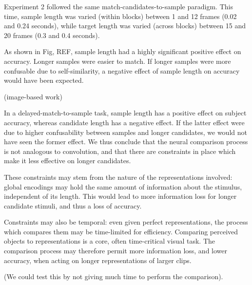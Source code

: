 \documentclass{jov}
\begin{document}
Experiment 2 followed the same match-candidates-to-sample paradigm. This time, sample length was varied (within blocks) between 1 and 12 frames (0.02 and 0.24 seconds), while target length was varied (across blocks) between 15 and 20 frames (0.3 and 0.4 seconds).

As shown in Fig, REF, sample length had a highly significant positive effect on accuracy. Longer samples were easier to match. If longer samples were more confusable due to self-similarity, a negative effect of sample length on accuracy would have been expected.

(image-based work)


In a delayed-match-to-sample task, sample length has a positive effect on subject accuracy, whereas candidate length has a negative effect. If the latter effect were due to  higher confusability between samples and longer candidates, we would not have seen the former effect. We thus conclude that the neural comparison process is not analogous to convolution, and that there are constraints in place which make it less effective on longer candidates.

These constraints may stem from the nature of the representations involved: global encodings may hold the same amount of information about the stimulus, independent of its length. This would lead to more information loss for longer candidate stimuli, and thus a loss of accuracy.

Constraints may also be temporal: even given perfect representations, the process which compares them may be time-limited for efficiency. Comparing perceived objects to representations is a core, often time-critical visual task. The comparison process may therefore permit more information loss, and lower accuracy, when acting on longer representations of larger clips.

(We could test this by not giving much time to perform the comparison). 
\end{document}
